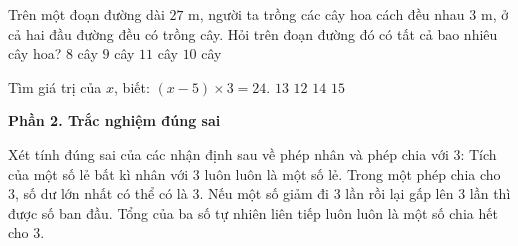 \begin{ex} %
Trên một đoạn đường dài $27\text{ m}$, người ta trồng các cây hoa cách đều nhau $3\text{ m}$, ở cả hai đầu đường đều có trồng cây. Hỏi trên đoạn đường đó có tất cả bao nhiêu cây hoa?
\choice
{$8$ cây}
{$9$ cây}
{$11$ cây}
{\True $10$ cây}
\end{ex}

\begin{ex} %
Tìm giá trị của $x$, biết: $(x - 5) \times 3 = 24$.
\choice
{\True $13$}
{$12$}
{$14$}
{$15$}
\end{ex}

\textbf{Phần 2. Trắc nghiệm đúng sai}

\begin{ex} %
Xét tính đúng sai của các nhận định sau về phép nhân và phép chia với $3$:
\choiceTF
{\True Tích của một số lẻ bất kì nhân với $3$ luôn luôn là một số lẻ.}
{Trong một phép chia cho $3$, số dư lớn nhất có thể có là $3$.}
{\True Nếu một số giảm đi $3$ lần rồi lại gấp lên $3$ lần thì được số ban đầu.}
{\True Tổng của ba số tự nhiên liên tiếp luôn luôn là một số chia hết cho $3$.}
\end{ex}

